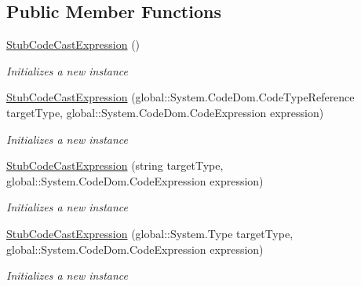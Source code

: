\subsection*{Public Member Functions}
\begin{DoxyCompactItemize}
\item 
\hyperlink{class_system_1_1_code_dom_1_1_fakes_1_1_stub_code_cast_expression_a7680e2cccc92721b6369832d12ac67da}{Stub\-Code\-Cast\-Expression} ()
\begin{DoxyCompactList}\small\item\em Initializes a new instance\end{DoxyCompactList}\item 
\hyperlink{class_system_1_1_code_dom_1_1_fakes_1_1_stub_code_cast_expression_a85974e45dc320f5cfe4f38300c6ecd39}{Stub\-Code\-Cast\-Expression} (global\-::\-System.\-Code\-Dom.\-Code\-Type\-Reference target\-Type, global\-::\-System.\-Code\-Dom.\-Code\-Expression expression)
\begin{DoxyCompactList}\small\item\em Initializes a new instance\end{DoxyCompactList}\item 
\hyperlink{class_system_1_1_code_dom_1_1_fakes_1_1_stub_code_cast_expression_a4e5c1f2e96170fd06af357fe895006f0}{Stub\-Code\-Cast\-Expression} (string target\-Type, global\-::\-System.\-Code\-Dom.\-Code\-Expression expression)
\begin{DoxyCompactList}\small\item\em Initializes a new instance\end{DoxyCompactList}\item 
\hyperlink{class_system_1_1_code_dom_1_1_fakes_1_1_stub_code_cast_expression_a459e4090554d7218cf95c0e91e70c40f}{Stub\-Code\-Cast\-Expression} (global\-::\-System.\-Type target\-Type, global\-::\-System.\-Code\-Dom.\-Code\-Expression expression)
\begin{DoxyCompactList}\small\item\em Initializes a new instance\end{DoxyCompactList}\end{DoxyCompactItemize}
